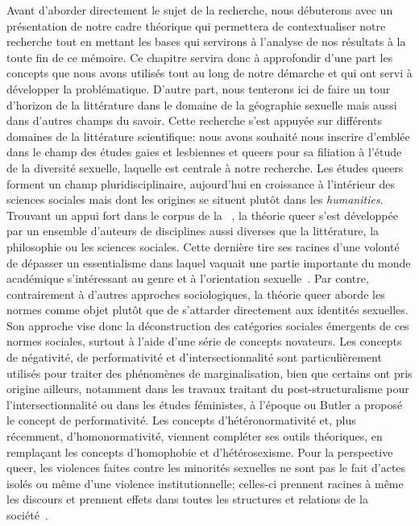 Avant d'aborder directement le sujet de la recherche, nous débuterons avec un présentation de notre cadre théorique qui permettera de contextualiser notre recherche tout en mettant les bases qui servirons à l'analyse de nos résultats à la toute fin de ce mémoire.
Ce chapitre servira donc à approfondir d'une part les concepts que nous avons utilisés tout au long de notre démarche et qui ont servi à développer la problématique.
D'autre part, nous tenterons ici de faire un tour d'horizon de la littérature dans le domaine de la géographie sexuelle mais aussi dans d'autres champs du savoir.
Cette recherche s’est appuyée sur différents domaines de la littérature scientifique: nous avons souhaité nous inscrire d'emblée dans le champ des études gaies et lesbiennes et queers pour sa filiation à l'étude de la diversité sexuelle, laquelle est centrale à notre recherche.
Les études queers forment un champ pluridisciplinaire, aujourd'hui en croissance à l'intérieur des sciences sociales mais dont les origines se situent plutôt dans les \emph{humanities}.
Trouvant un appui fort dans le corpus de la ~\citep[et principalement Foucault, voir][11]{Kemp2009}, la théorie queer s'est développée par un ensemble d'auteurs de disciplines aussi diverses que la littérature, la philosophie ou les sciences sociales.
Cette dernière tire ses racines d'une volonté de dépasser un essentialisme dans laquel vaquait une partie importante du monde académique s'intéressant au genre et à l'orientation sexuelle~\citep[27--28]{Green2007}.
Par contre, contrairement à d'autres approches sociologiques, la théorie queer aborde les normes comme objet plutôt que de s'attarder directement aux identités sexuelles. 
Son approche vise donc la déconstruction des catégories sociales émergents de ces normes sociales, surtout à l'aide d'une série de concepts novateurs.
Les concepts de négativité, de performativité et d'intersectionnalité sont particulièrement utilisés pour traiter des phénomènes de marginalisation, bien que certains ont pris origine ailleurs, notamment dans les travaux traitant du post-structuralisme pour l'intersectionnalité ou dans les études féministes, à l'époque ou Butler a proposé le concept de performativité.
Les concepts d'hétéronormativité et, plus récemment, d'homonormativité, viennent compléter ses outils théoriques, en remplaçant les concepts d'homophobie et d'hétérosexisme.
Pour la perspective queer, les violences faites contre les minorités sexuelles ne sont pas le fait d'actes isolés ou même d'une violence institutionnelle; celles-ci prennent racines à même les discours et prennent effets dans toutes les structures et relations de la société~\citep{BastienCharlebois2011}.

